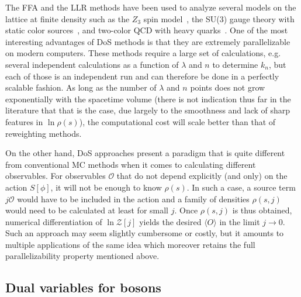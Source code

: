 \documentclass[../main.tex]{subfiles}
\begin{document}
The FFA and the LLR methods have been used to analyze several models on the lattice at finite
density such as the $Z_3$ spin model~\cite{GATTRINGER2015545}, the SU(3) gauge theory with static color sources~\cite{GIULIANI2016627, GIULIANI2017166},
and two-color QCD with heavy quarks~\cite{PhysRevD.88.071502}. One of the most interesting advantages of DoS methods is that they are extremely
parallelizable on modern computers. These methods require a large set of calculations, e.g. several independent calculations as a function of $\lambda$
and $n$ to determine $k_n$, but each of those is an independent run and can therefore be done in a perfectly scalable fashion. As long as the number of $\lambda$
and $n$ points does not grow exponentially with the spacetime volume (there is not indication thus far in the literature that that is the case, due largely to the
smoothness and lack of sharp features in $\ln \rho(s)$), the computational cost will scale better than that of reweighting methods.

On the other hand, DoS approaches present a paradigm that is quite different from conventional MC methods when it comes to calculating different observables.
For observables $\mathcal O$ that do not depend explicitly (and only) on the action $S[\phi]$, it will not be enough to know $\rho(s)$. In such a case,
a source term $j \mathcal O$ would have to be included in the action and a family of densities $\rho(s,j)$ would need to be calculated at least for small $j$.
Once $\rho(s,j)$ is thus obtained, numerical differentiation of $\ln \mathcal Z[j]$ yields the desired $\langle O\rangle$ in the limit $j \to 0$. Such an approach may seem
slightly cumbersome or costly, but it amounts to multiple applications of the same idea which moreover retains the full parallelizability property mentioned above.


\subsection{Dual variables for bosons~\label{sect:DualVariables}}
\end{document}
